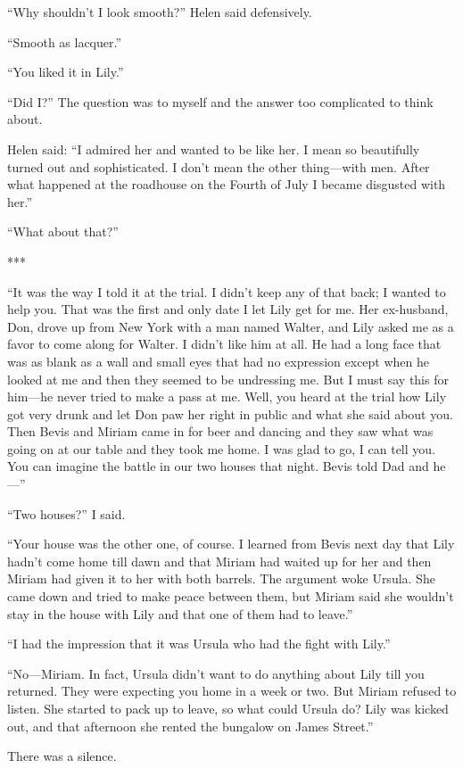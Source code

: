 \documentclass{novel}
\begin{document}
“Why shouldn’t I look smooth?” Helen said defensively.

“Smooth as lacquer.”

“You liked it in Lily.”

“Did I?” The question was to myself and the answer too complicated to think about.

Helen said: “I admired her and wanted to be like her. I mean so beautifully turned out and sophisticated. I don’t mean the other thing—with men. After what happened at the roadhouse on the Fourth of July I became disgusted with her.”

“What about that?”

***

“It was the way I told it at the trial. I didn’t keep any of that back; I wanted to help you. That was the first and only date I let Lily get for me. Her ex-husband, Don, drove up from New York with a man named Walter, and Lily asked me as a favor to come along for Walter. I didn’t like him at all. He had a long face that was as blank as a wall and small eyes that had no expression except when he looked at me and then they seemed to be undressing me. But I must say this for him—he never tried to make a pass at me. Well, you heard at the trial how Lily got very drunk and let Don paw her right in public and what she said about you. Then Bevis and Miriam came in for beer and dancing and they saw what was going on at our table and they took me home. I was glad to go, I can tell you. You can imagine the battle in our two houses that night. Bevis told Dad and he—”

“Two houses?” I said.

“Your house was the other one, of course. I learned from Bevis next day that Lily hadn’t come home till dawn and that Miriam had waited up for her and then Miriam had given it to her with both barrels. The argument woke Ursula. She came down and tried to make peace between them, but Miriam said she wouldn’t stay in the house with Lily and that one of them had to leave.”

“I had the impression that it was Ursula who had the fight with Lily.”

“No—Miriam. In fact, Ursula didn’t want to do anything about Lily till you returned. They were expecting you home in a week or two. But Miriam refused to listen. She started to pack up to leave, so what could Ursula do? Lily was kicked out, and that afternoon she rented the bungalow on James Street.”

There was a silence.
\end{document}
